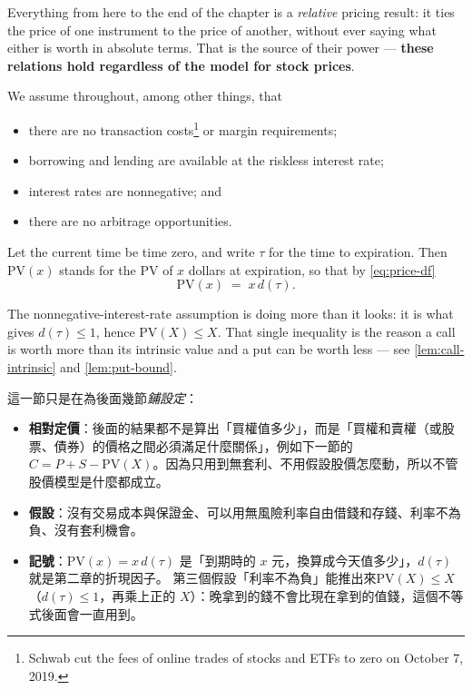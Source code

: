
\suppstart
Everything from here to the end of the chapter is a \emph{relative} pricing result: it ties the price of one instrument to the price of another, without ever saying what either is worth in absolute terms.
\suppend
That is the source of their power --- \textbf{these relations hold regardless of the model for stock prices}.

\begin{notation}
	We assume throughout, among other things, that
	\begin{itemize}[nosep]
		\item there are no transaction costs\footnote{Schwab cut the fees of online trades of stocks and ETFs to zero on October 7, 2019.} or margin requirements;
		\item borrowing and lending are available at the riskless interest rate;
		\item interest rates are nonnegative; and
		\item there are no arbitrage opportunities.
	\end{itemize}
	Let the current time be time zero, and write $\tau$ for the time to expiration.
	Then $\mathrm{PV}(x)$ stands for the PV of $x$ dollars at expiration, so that by \eqref{eq:price-df}
	\begin{equation}
		\mathrm{PV}(x) \;=\; x\,d(\tau) .
		\label{eq:pv-tau}
	\end{equation}
\end{notation}

\suppstart
\begin{note}
	The nonnegative-interest-rate assumption is doing more than it looks: it is what gives $d(\tau)\le 1$, hence $\mathrm{PV}(X)\le X$.
	That single inequality is the reason a call is worth more than its intrinsic value and a put can be worth less --- see \autoref{lem:call-intrinsic} and \autoref{lem:put-bound}.
\end{note}

\begin{remark}
	這一節只是在為後面幾節\emph{鋪設定}：
	\begin{itemize}[nosep]
		\item \textbf{相對定價}：後面的結果都不是算出「買權值多少」，而是「買權和賣權（或股票、債券）的價格之間必須滿足什麼關係」，例如下一節的 $C=P+S-\mathrm{PV}(X)$。因為只用到無套利、不用假設股價怎麼動，所以不管股價模型是什麼都成立。
		\item \textbf{假設}：沒有交易成本與保證金、可以用無風險利率自由借錢和存錢、利率不為負、沒有套利機會。
		\item \textbf{記號}：$\mathrm{PV}(x)=x\,d(\tau)$ 是「到期時的 $x$ 元，換算成今天值多少」，$d(\tau)$ 就是第二章的折現因子。 第三個假設「利率不為負」能推出來$\mathrm{PV}(X)\le X$ （$d(\tau)\le1$，再乘上正的 $X$）：晚拿到的錢不會比現在拿到的值錢，這個不等式後面會一直用到。
	\end{itemize}
\end{remark}
\suppend

